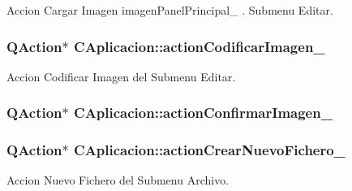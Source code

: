 Accion Cargar Imagen imagen\+Panel\+Principal\+\_\+ . Submenu Editar. 

\subsubsection[{\texorpdfstring{action\+Codificar\+Imagen\+\_\+}{actionCodificarImagen_}}]{\setlength{\rightskip}{0pt plus 5cm}Q\+Action$\ast$ C\+Aplicacion\+::action\+Codificar\+Imagen\+\_\+\hspace{0.3cm}{\ttfamily [private]}}\hypertarget{classCAplicacion_a06464c87dd4924cc8bb92f946239f603}{}\label{classCAplicacion_a06464c87dd4924cc8bb92f946239f603}


Accion Codificar Imagen del Submenu Editar. 

\subsubsection[{\texorpdfstring{action\+Confirmar\+Imagen\+\_\+}{actionConfirmarImagen_}}]{\setlength{\rightskip}{0pt plus 5cm}Q\+Action$\ast$ C\+Aplicacion\+::action\+Confirmar\+Imagen\+\_\+\hspace{0.3cm}{\ttfamily [private]}}\hypertarget{classCAplicacion_aa897b20516e31a2992e58f92cd9b4ddf}{}\label{classCAplicacion_aa897b20516e31a2992e58f92cd9b4ddf}
\subsubsection[{\texorpdfstring{action\+Crear\+Nuevo\+Fichero\+\_\+}{actionCrearNuevoFichero_}}]{\setlength{\rightskip}{0pt plus 5cm}Q\+Action$\ast$ C\+Aplicacion\+::action\+Crear\+Nuevo\+Fichero\+\_\+\hspace{0.3cm}{\ttfamily [private]}}\hypertarget{classCAplicacion_a1ccc6631cd5cc2efa064edb56c8d0599}{}\label{classCAplicacion_a1ccc6631cd5cc2efa064edb56c8d0599}


Accion Nuevo Fichero del Submenu Archivo. 

